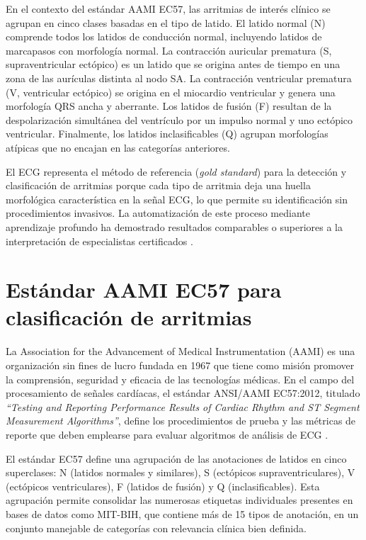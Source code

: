 En el contexto del estándar AAMI EC57, las arritmias de interés clínico se agrupan en cinco clases basadas en el tipo de latido. El latido normal (N) comprende todos los latidos de conducción normal, incluyendo latidos de marcapasos con morfología normal. La contracción auricular prematura (S, supraventricular ectópico) es un latido que se origina antes de tiempo en una zona de las aurículas distinta al nodo SA. La contracción ventricular prematura (V, ventricular ectópico) se origina en el miocardio ventricular y genera una morfología QRS ancha y aberrante. Los latidos de fusión (F) resultan de la despolarización simultánea del ventrículo por un impulso normal y uno ectópico ventricular. Finalmente, los latidos inclasificables (Q) agrupan morfologías atípicas que no encajan en las categorías anteriores.

El ECG representa el método de referencia (\textit{gold standard}) para la detección y clasificación de arritmias porque cada tipo de arritmia deja una huella morfológica característica en la señal ECG, lo que permite su identificación sin procedimientos invasivos. La automatización de este proceso mediante aprendizaje profundo ha demostrado resultados comparables o superiores a la interpretación de especialistas certificados \cite{Hannun2019}.

\section{Estándar AAMI EC57 para clasificación de arritmias}

La Association for the Advancement of Medical Instrumentation (AAMI) es una organización sin fines de lucro fundada en 1967 que tiene como misión promover la comprensión, seguridad y eficacia de las tecnologías médicas. En el campo del procesamiento de señales cardíacas, el estándar ANSI/AAMI EC57:2012, titulado \textit{``Testing and Reporting Performance Results of Cardiac Rhythm and ST Segment Measurement Algorithms''}, define los procedimientos de prueba y las métricas de reporte que deben emplearse para evaluar algoritmos de análisis de ECG \cite{AAMI2012}.

El estándar EC57 define una agrupación de las anotaciones de latidos en cinco superclases: N (latidos normales y similares), S (ectópicos supraventriculares), V (ectópicos ventriculares), F (latidos de fusión) y Q (inclasificables). Esta agrupación permite consolidar las numerosas etiquetas individuales presentes en bases de datos como MIT-BIH, que contiene más de 15 tipos de anotación, en un conjunto manejable de categorías con relevancia clínica bien definida.

